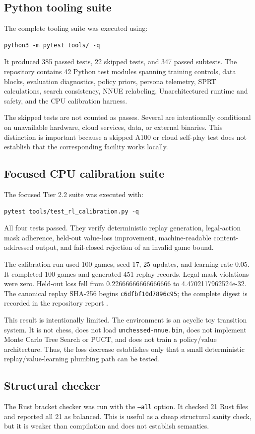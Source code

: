 \documentclass[conference]{IEEEtran}
\newcommand{\code}[1]{\texttt{\small #1}}
\begin{document}
\subsection{Python tooling suite}
The complete tooling suite was executed using:
\begin{verbatim}
python3 -m pytest tools/ -q
\end{verbatim}
It produced 385 passed tests, 22 skipped tests, and 347 passed subtests. The repository contains 42 Python test modules spanning training controls, data blocks, evaluation diagnostics, policy priors, persona telemetry, SPRT calculations, search consistency, NNUE relabeling, Unarchitectured runtime and safety, and the CPU calibration harness.

The skipped tests are not counted as passes. Several are intentionally conditional on unavailable hardware, cloud services, data, or external binaries. This distinction is important because a skipped A100 or cloud self-play test does not establish that the corresponding facility works locally.

\subsection{Focused CPU calibration suite}
The focused Tier 2.2 suite was executed with:
\begin{verbatim}
pytest tools/test_rl_calibration.py -q
\end{verbatim}
All four tests passed. They verify deterministic replay generation, legal-action mask adherence, held-out value-loss improvement, machine-readable content-addressed output, and fail-closed rejection of an invalid game bound.

The calibration run used 100 games, seed 17, 25 updates, and learning rate 0.05. It completed 100 games and generated 451 replay records. Legal-mask violations were zero. Held-out loss fell from 0.22666666666666666 to 4.4702117962524e-32. The canonical replay SHA-256 begins \code{c6dfbf10d7896c95}; the complete digest is recorded in the repository report \cite{tier2}.

This result is intentionally limited. The environment is an acyclic toy transition system. It is not chess, does not load \code{unchessed-nnue.bin}, does not implement Monte Carlo Tree Search or PUCT, and does not train a policy/value architecture. Thus, the loss decrease establishes only that a small deterministic replay/value-learning plumbing path can be tested.

\subsection{Structural checker}
The Rust bracket checker was run with the \code{--all} option. It checked 21 Rust files and reported all 21 as balanced. This is useful as a cheap structural sanity check, but it is weaker than compilation and does not establish semantics.
\end{document}
